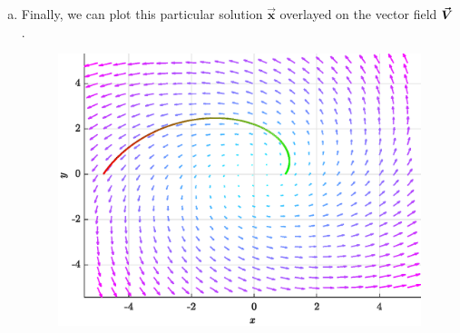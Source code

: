 \documentclass[12pt]{article} %
\newcommand{\vecx}{\boldsymbol{\vec{x}}}
\begin{document}
\begin{solution}
\begin{enumerate}[(a)]
\item Finally, we can plot this particular solution $\vecx$ overlayed on the vector field $\boldsymbol{\vec{V}}$.
\begin{figure}[H]
    \centering
    \includegraphics[width=.6\textwidth]{figures/flow}   
\end{figure}
\end{enumerate}
\end{solution}

\newpage
\end{document}
